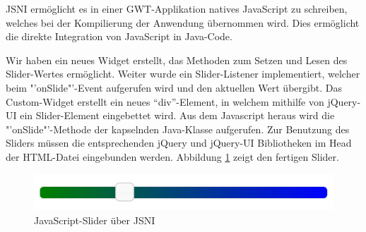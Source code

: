 JSNI ermöglicht es in einer GWT-Applikation natives JavaScript zu schreiben, welches bei der Kompilierung der Anwendung übernommen wird. Dies ermöglicht die direkte Integration von JavaScript in Java-Code.

Wir haben ein neues Widget erstellt, das Methoden zum Setzen und Lesen des Slider-Wertes ermöglicht. Weiter wurde ein Slider-Listener implementiert, welcher beim "'onSlide"'-Event aufgerufen wird und den aktuellen Wert übergibt. Das Custom-Widget erstellt ein neues "`div"'-Element, in welchem mithilfe von jQuery-UI ein Slider-Element eingebettet wird. Aus dem Javascript heraus wird die "'onSlide"'-Methode der kapselnden Java-Klasse aufgerufen. Zur Benutzung des Sliders müssen die entsprechenden jQuery und jQuery-UI Bibliotheken im Head der HTML-Datei eingebunden werden. Abbildung \ref{fig:DISlider} zeigt den fertigen Slider.

\begin{figure}[tbh]
\centering
\includegraphics[width=0.7\linewidth]{Bilder/DISlider}
\caption{JavaScript-Slider über JSNI}
\label{fig:DISlider}
\end{figure}

